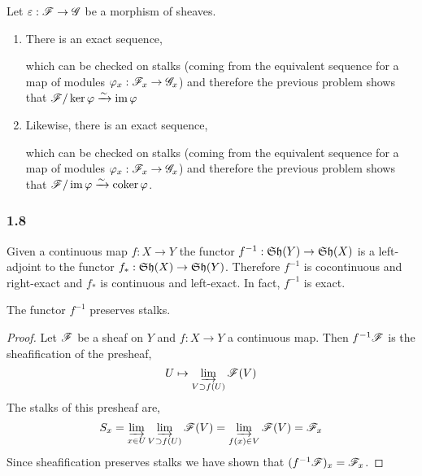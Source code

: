 \documentclass[12pt]{article}
\begin{document}
Let $\varepsilon : \mathscr{F} \to \mathscr{G}$ be a morphism of sheaves.
\begin{enumerate}
\item There is an exact sequence,
\begin{center}
\end{center}
which can be checked on stalks (coming from the equivalent sequence for a map of modules $\varphi_x : \mathscr{F}_x \to \mathscr{G}_x$)
and therefore the previous problem shows that $\mathscr{F} / \ker{\varphi} \xrightarrow{\sim} \operatorname{\mathrm{im}}{\varphi}$

\item Likewise, there is an exact sequence,
\begin{center}
\end{center}
which can be checked on stalks (coming from the equivalent sequence for a map of modules $\varphi_x : \mathscr{F}_x \to \mathscr{G}_x$)
and therefore the previous problem shows that $\mathscr{F} / \operatorname{\mathrm{im}}{\varphi} \xrightarrow{\sim} \operatorname{\mathrm{coker}}{\varphi}$.
\end{enumerate}

\subsubsection{1.8}

Given a continuous map $f : X \to Y$ the functor $f^{-1} : \mathfrak{Sh}(Y) \to \mathfrak{Sh}(X)$ is a left-adjoint to the functor $f_* : \mathfrak{Sh}(X) \to \mathfrak{Sh}(Y)$. Therefore $f^{-1}$ is cocontinuous and right-exact and $f_*$ is continuous and left-exact. In fact, $f^{-1}$ is exact. 

\begin{lemma}
The functor $f^{-1}$ preserves stalks.
\end{lemma}

\begin{proof}
Let $\mathscr{F}$ be a sheaf on $Y$ and $f : X \to Y$ a continuous map. Then $f^{-1} \mathscr{F}$ is the sheafification of the presheaf,
\[ U \mapsto \varinjlim_{V \supset f(U)} \mathscr{F}(V) \]
The stalks of this presheaf are,
\[ S_x = \varinjlim_{x \in U} \varinjlim_{V \supset f(U)} \mathscr{F}(V) = \varinjlim_{f(x) \in V} \mathscr{F}(V) = \mathscr{F}_x \]
Since sheafification preserves stalks we have shown that $(f^{-1} \mathscr{F})_x = \mathscr{F}_x$.
\end{proof}
\end{document}
